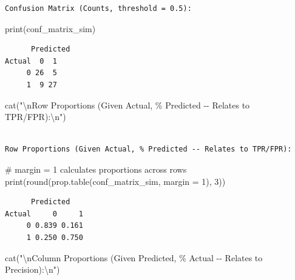 \documentclass[
  letterpaper,
]{scrbook}
\newenvironment{Shaded}{\begin{snugshade}}{\end{snugshade}}
\newcommand{\AttributeTok}[1]{\textcolor[rgb]{0.40,0.45,0.13}{#1}}
\newcommand{\CommentTok}[1]{\textcolor[rgb]{0.37,0.37,0.37}{#1}}
\newcommand{\DecValTok}[1]{\textcolor[rgb]{0.68,0.00,0.00}{#1}}
\newcommand{\FunctionTok}[1]{\textcolor[rgb]{0.28,0.35,0.67}{#1}}
\newcommand{\NormalTok}[1]{\textcolor[rgb]{0.00,0.23,0.31}{#1}}
\newcommand{\SpecialCharTok}[1]{\textcolor[rgb]{0.37,0.37,0.37}{#1}}
\newcommand{\StringTok}[1]{\textcolor[rgb]{0.13,0.47,0.30}{#1}}
\begin{document}
\begin{verbatim}
Confusion Matrix (Counts, threshold = 0.5):
\end{verbatim}

\begin{Shaded}
\begin{Highlighting}[]
\FunctionTok{print}\NormalTok{(conf\_matrix\_sim)}
\end{Highlighting}
\end{Shaded}

\begin{verbatim}
      Predicted
Actual  0  1
     0 26  5
     1  9 27
\end{verbatim}

\begin{Shaded}
\begin{Highlighting}[]
\FunctionTok{cat}\NormalTok{(}\StringTok{"}\SpecialCharTok{\textbackslash{}n}\StringTok{Row Proportions (Given Actual, \% Predicted {-}{-} Relates to TPR/FPR):}\SpecialCharTok{\textbackslash{}n}\StringTok{"}\NormalTok{)}
\end{Highlighting}
\end{Shaded}

\begin{verbatim}

Row Proportions (Given Actual, % Predicted -- Relates to TPR/FPR):
\end{verbatim}

\begin{Shaded}
\begin{Highlighting}[]
\CommentTok{\# margin = 1 calculates proportions across rows}
\FunctionTok{print}\NormalTok{(}\FunctionTok{round}\NormalTok{(}\FunctionTok{prop.table}\NormalTok{(conf\_matrix\_sim, }\AttributeTok{margin =} \DecValTok{1}\NormalTok{), }\DecValTok{3}\NormalTok{))}
\end{Highlighting}
\end{Shaded}

\begin{verbatim}
      Predicted
Actual     0     1
     0 0.839 0.161
     1 0.250 0.750
\end{verbatim}

\begin{Shaded}
\begin{Highlighting}[]
\FunctionTok{cat}\NormalTok{(}\StringTok{"}\SpecialCharTok{\textbackslash{}n}\StringTok{Column Proportions (Given Predicted, \% Actual {-}{-} Relates to Precision):}\SpecialCharTok{\textbackslash{}n}\StringTok{"}\NormalTok{)}
\end{Highlighting}
\end{Shaded}
\end{document}
